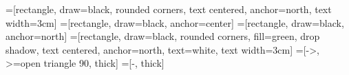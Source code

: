 \documentclass[12pt,spanish,fleqn,openany,letterpaper,pagesize]{scrbook}
\theoremstyle{plain}
\begin{document}
=[rectangle, draw=black, rounded corners, text centered, anchor=north, text width=3cm] %
=[rectangle, draw=black, anchor=center]
=[rectangle, draw=black, anchor=north]
=[rectangle, draw=black, rounded corners, fill=green, drop shadow, text centered, anchor=north, text=white, text width=3cm]
=[->, >=open triangle 90, thick]
=[-, thick]



\renewcommand{\tablename}{\textbf{Tabla}}
\renewcommand{\figurename}{\textbf{Figura}}
\renewcommand{\listtablename}{Lista de Tablas}
\renewcommand{\listfigurename}{Lista de Figuras}
\renewcommand{\contentsname}{Contenido}

\newcommand{\clearemptydoublepage}{\newpage{\pagestyle{empty}\cleardoublepage}}
\tableofcontents

\cleardoublepage
{} %
\listoffigures %

\cleardoublepage

\lstlistoflistings
\cleardoublepage

% 

% 



% 
% 
% 
% 

\cleardoublepage
{}
\printbibliography
\end{document}
